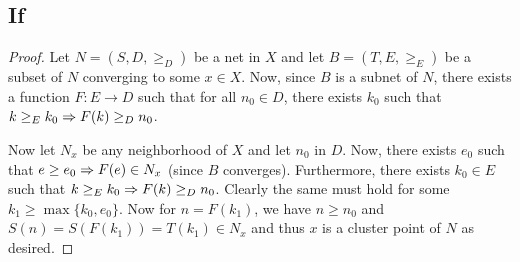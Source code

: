 \subsection*{If}
\begin{proof}
Let $N=(S,D,\geq_D)$ be a net in $X$ and let $B=(T,E,\geq_E)$ be a subset of $N$ converging to some $x\in X$. Now, since $B$ is a subnet of $N$, there exists a function $F: E\to D$ such that for all $n_0\in D$, there exists $k_0$ such that $k\geq_E k_0 \Rightarrow F(k) \geq_D n_0$. \par
Now let $N_x$ be any neighborhood of $X$ and let $n_0$ in $D$. Now, there exists $e_0$ such that $e\geq e_0 \Rightarrow F(e) \in N_x$ (since $B$ converges). Furthermore, there exists $k_0 \in E$ such that $k\geq_E k_0 \Rightarrow F(k)\geq_D n_0$. Clearly the same must hold for some $k_1 \geq \max\{k_0, e_0\}$. Now for $n=F(k_1)$, we have $n\geq n_0$ and $S(n) = S(F(k_1)) = T(k_1) \in N_x$ and thus $x$ is a cluster point of $N$ as desired. 

\end{proof}
